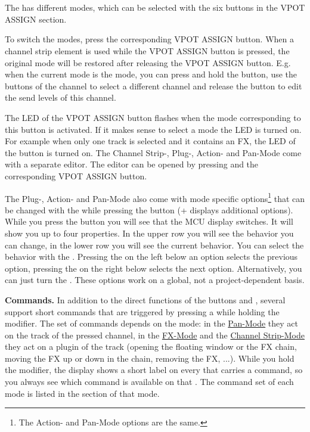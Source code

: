 \section{\fsm}\label{csmodes}

The \fs has different modes, which can be
selected with the six buttons in the VPOT ASSIGN section.

To switch the modes, press the corresponding VPOT ASSIGN button. When
a channel strip element is used while the VPOT ASSIGN button is
pressed, the original mode will be restored after releasing the VPOT
ASSIGN button. E.g. when the current mode is the \send mode, you can
press and hold the \pan button, use the \select buttons of the channel
to select a different channel and release the \pan button to edit the
send levels of this channel.

The LED of the VPOT ASSIGN button flashes when the mode corresponding
to this button is activated. If it makes sense to select a mode the LED
is turned on. For example when only one track is selected and it contains an
FX, the LED of the \plug button is turned on. The Channel Strip-, Plug-,
Action- and Pan-Mode come with a separate editor. The editor can be opened
by pressing \alt and the corresponding VPOT ASSIGN button.

The Plug-, Action- and Pan-Mode also come with mode specific
options\footnote{The Action- and Pan-Mode options are the same.} that
can be changed with the \vpots while pressing the \option button
(\shift + \option displays additional options).  While you press the
\option button you will see that the MCU display switches. It will
show you up to four properties. In the upper row you will see the
behavior you can change, in the lower row you will see the current
behavior. You can select the behavior with the \vpots. Pressing the
\vpot on the left below an option selects the previous option,
pressing the \vpot on the right below selects the next
option. Alternatively, you can just turn the \vpots. These options
work on a global, not a project-dependent basis.

\noindent
\textbf{Commands.}\label{commands} In addition to the direct functions of
the buttons and \vpots, several \fsm support short
commands that are triggered by pressing a \vpot while holding the
\control modifier. The set of commands depends on the mode: in the
\hyperref[panmode]{Pan-Mode} they act on the track of the pressed channel,
in the \hyperref[plugmode]{FX-Mode} and the
\hyperref[channelstrip]{Channel Strip-Mode} they act on a plugin of the
track (opening the floating window or the FX chain, moving the FX up or down
in the chain, removing the FX, ...). While you hold the \control modifier,
the display shows a short label on every \vpot that carries a command, so
you always see which command is available on that \vpot. The command set of
each mode is listed in the section of that mode.

